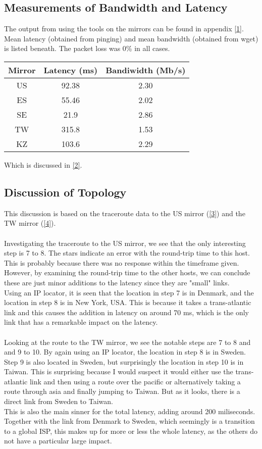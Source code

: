 \documentclass{acm_proc_article-sp}
\begin{document}
\subsection{Measurements of Bandwidth and Latency}
The output from using the tools on the mirrors can be found in appendix \ref{1}. Mean latency (obtained from pinging) and mean bandwidth (obtained from wget) is listed beneath. The packet loss was 0\% in all cases.\\
\begin{center}
\begin{tabular}{|c|c|c|}
\hline 
Mirror & Latency (ms) & Bandiwidth (Mb/s)\\ 
\hline 
US & 92.38 & 2.30 \\ 
\hline 
ES & 55.46 & 2.02 \\ 
\hline 
SE & 21.9 & 2.86 \\ 
\hline 
TW & 315.8 & 1.53 \\ 
\hline 
KZ & 103.6 & 2.29 \\ 
\hline 
\end{tabular}
\end{center}
Which is discussed in \ref{2}.

\subsection{Discussion of Topology}
This discussion is based on the traceroute data to the US mirror (\ref{3}) and the TW mirror (\ref{4}).\\
\\
Investigating the traceroute to the US mirror, we see that the only interesting step is 7 to 8. The stars indicate an error with the round-trip time to this host. This is probably because there was no response within the timeframe given. However, by examining the round-trip time to the other hosts, we can conclude these are just minor additions to the latency since they are "small" links.\\
Using an IP locator, it is seen that the location in step 7 is in Denmark, and the location in step 8 is in New York, USA. This is because it takes a trans-atlantic link and this causes the addition in latency on around 70 ms, which is the only link that has a remarkable impact on the latency.\\
\\
Looking at the route to the TW mirror, we see the notable steps are 7 to 8 and and 9 to 10. By again using an IP locator, the location in step 8 is in Sweden. Step 9 is also located in Sweden, but surprisingly the location in step 10 is in Taiwan. This is surprising because I would suspect it would either use the trans-atlantic link and then using a route over the pacific or alternatively taking a route through asia and finally jumping to Taiwan. But as it looks, there is a direct link from Sweden to Taiwan.\\
This is also the main sinner for the total latency, adding around 200 miliseconds. Together with the link from Denmark to Sweden, which seemingly is a transition to a global ISP, this makes up for more or less the whole latency, as the others do not have a particular large impact.
\end{document}
